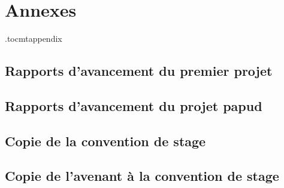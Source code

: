 
\appendix
\part*{Annexes}

\cleardoublepage

\etocdepthtag.toc{mtappendix}

\tableofcontents
\cleardoublepage


\cleardoublepage
\listoffigures\cleardoublepage
\listoftables\cleardoublepage
\lstlistoflistings\cleardoublepage
\cleardoublepage

\cleardoublepage
\chapter{Rapports d'avancement du premier projet}
\cleardoublepage

\chapter{Rapports d'avancement du projet \gls{papud}}
\cleardoublepage

\chapter{Copie de la convention de stage}
\cleardoublepage

\chapter{Copie de l'avenant à la convention de stage}
\cleardoublepage
